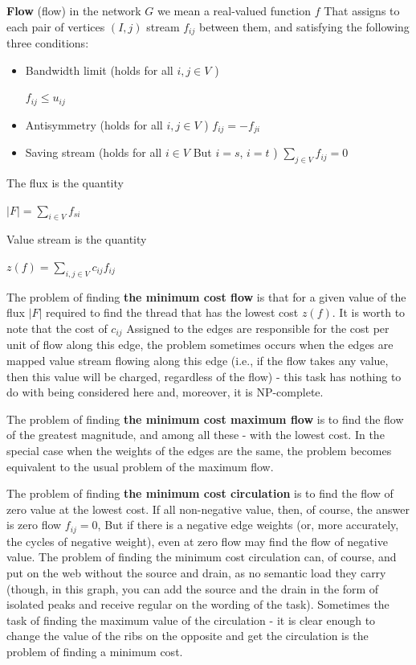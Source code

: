 \textbf{Flow} (flow) in the network $G$ we mean a real-valued function $f$ That assigns to each pair of vertices $(I, j)$ stream $f_ {ij}$ between them, and satisfying the following three conditions:

\begin{itemize} \item Bandwidth limit (holds for all $i, j \in V$ )

$f_ {ij} \le u_ {ij}$

\item Antisymmetry (holds for all $i, j \in V$ )
$f_ {ij} = - f_ {ji}$

\item Saving stream (holds for all $i \in V$ But $i = s$, $i = t$ )
$\sum_ {j \in V} f_ {ij} = 0$

\end{itemize}
The flux is the quantity

$| F | = \sum_ {i \in V} f_ {si}$

Value stream is the quantity

$z (f) = \sum_ {i, j \in V} c_ {ij} f_ {ij}$

The problem of finding \textbf{the minimum cost flow} is that for a given value of the flux $| F |$ required to find the thread that has the lowest cost $z (f)$. It is worth to note that the cost of $c_ {ij}$ Assigned to the edges are responsible for the cost per unit of flow along this edge, the problem sometimes occurs when the edges are mapped value stream flowing along this edge (i.e., if the flow takes any value, then this value will be charged, regardless of the flow) - this task has nothing to do with being considered here and, moreover, it is NP-complete.

The problem of finding \textbf{the minimum cost maximum flow} is to find the flow of the greatest magnitude, and among all these - with the lowest cost. In the special case when the weights of the edges are the same, the problem becomes equivalent to the usual problem of the maximum flow.

The problem of finding \textbf{the minimum cost circulation} is to find the flow of zero value at the lowest cost. If all non-negative value, then, of course, the answer is zero flow $f_ {ij} = 0$, But if there is a negative edge weights (or, more accurately, the cycles of negative weight), even at zero flow may find the flow of negative value. The problem of finding the minimum cost circulation can, of course, and put on the web without the source and drain, as no semantic load they carry (though, in this graph, you can add the source and the drain in the form of isolated peaks and receive regular on the wording of the task). Sometimes the task of finding the maximum value of the circulation - it is clear enough to change the value of the ribs on the opposite and get the circulation is the problem of finding a minimum cost.

